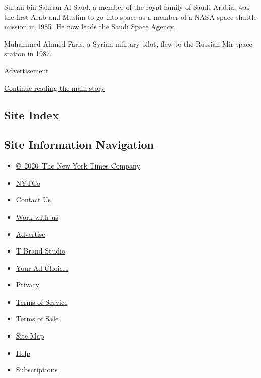 Sultan bin Salman Al Saud, a member of the royal family of Saudi Arabia,
was the first Arab and Muslim to go into space as a member of a NASA
space shuttle mission in 1985. He now leads the Saudi Space Agency.

Muhammed Ahmed Faris, a Syrian military pilot, flew to the Russian Mir
space station in 1987.

Advertisement

\protect\hyperlink{after-bottom}{Continue reading the main story}

\hypertarget{site-index}{%
\subsection{Site Index}\label{site-index}}

\hypertarget{site-information-navigation}{%
\subsection{Site Information
Navigation}\label{site-information-navigation}}

\begin{itemize}
\tightlist
\item
  \href{https://help.nytimes3xbfgragh.onion/hc/en-us/articles/115014792127-Copyright-notice}{©~2020~The
  New York Times Company}
\end{itemize}

\begin{itemize}
\tightlist
\item
  \href{https://www.nytco.com/}{NYTCo}
\item
  \href{https://help.nytimes3xbfgragh.onion/hc/en-us/articles/115015385887-Contact-Us}{Contact
  Us}
\item
  \href{https://www.nytco.com/careers/}{Work with us}
\item
  \href{https://nytmediakit.com/}{Advertise}
\item
  \href{http://www.tbrandstudio.com/}{T Brand Studio}
\item
  \href{https://www.nytimes3xbfgragh.onion/privacy/cookie-policy\#how-do-i-manage-trackers}{Your
  Ad Choices}
\item
  \href{https://www.nytimes3xbfgragh.onion/privacy}{Privacy}
\item
  \href{https://help.nytimes3xbfgragh.onion/hc/en-us/articles/115014893428-Terms-of-service}{Terms
  of Service}
\item
  \href{https://help.nytimes3xbfgragh.onion/hc/en-us/articles/115014893968-Terms-of-sale}{Terms
  of Sale}
\item
  \href{https://spiderbites.nytimes3xbfgragh.onion}{Site Map}
\item
  \href{https://help.nytimes3xbfgragh.onion/hc/en-us}{Help}
\item
  \href{https://www.nytimes3xbfgragh.onion/subscription?campaignId=37WXW}{Subscriptions}
\end{itemize}
